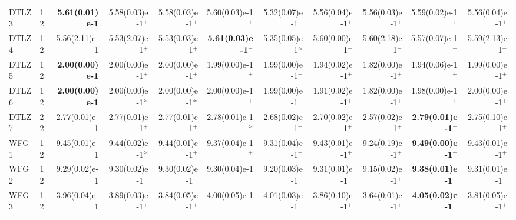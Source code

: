 \documentclass[pdflatex,sn-mathphys-ay]{sn-jnl}%
\theoremstyle{thmstyleone}%
\theoremstyle{thmstyletwo}%
\theoremstyle{thmstylethree}%
\begin{document}
\begin{landscape}
{\begin{longtable}{llrrrrrrrrr}
			DTLZ3                             & 12  & \textbf{5.61(0.01)e-1} & 5.58(0.03)e-1$^{+}$       & 5.58(0.03)e-1$^{+}$       & 5.60(0.03)e-1$^{+}$          & 5.32(0.07)e-1$^{+}$       & 5.56(0.04)e-1$^{+}$          & 5.56(0.03)e-1$^{+}$       & 5.59(0.02)e-1$^{+}$          & 5.56(0.04)e-1$^{+}$          \\
			DTLZ4                             & 12  & 5.56(2.11)e-1          & 5.53(2.07)e-1$^{+}$       & 5.53(0.03)e-1$^{+}$       & \textbf{5.61(0.03)e-1}$^{-}$ & 5.35(0.05)e-1$^{\approx}$ & 5.60(0.00)e-1$^{-}$          & 5.60(2.18)e-1$^{-}$       & 5.57(0.07)e-1$^{-}$          & 5.59(2.13)e-1$^{-}$          \\
			DTLZ5                             & 12  & \textbf{2.00(0.00)e-1} & 2.00(0.00)e-1$^{+}$       & 2.00(0.00)e-1$^{+}$       & 1.99(0.00)e-1$^{+}$          & 1.99(0.00)e-1$^{+}$       & 1.94(0.02)e-1$^{+}$          & 1.82(0.00)e-1$^{+}$       & 1.94(0.06)e-1$^{+}$          & 1.99(0.00)e-1$^{+}$          \\
			DTLZ6                             & 12  & \textbf{2.00(0.00)e-1} & 2.00(0.00)e-1$^{\approx}$ & 2.00(0.00)e-1$^{\approx}$ & 2.00(0.00)e-1$^{+}$          & 1.99(0.00)e-1$^{+}$       & 1.91(0.02)e-1$^{+}$          & 1.82(0.00)e-1$^{+}$       & 1.98(0.00)e-1$^{+}$          & 2.00(0.00)e-1$^{+}$          \\
			DTLZ7                             & 22  & 2.77(0.01)e-1          & 2.77(0.01)e-1$^{+}$       & 2.77(0.01)e-1$^{+}$       & 2.78(0.01)e-1$^{\approx}$    & 2.68(0.02)e-1$^{+}$       & 2.70(0.02)e-1$^{+}$          & 2.57(0.02)e-1$^{+}$       & \textbf{2.79(0.01)e-1}$^{-}$ & 2.75(0.10)e-1$^{+}$          \\
			\midrule
			WFG1                              & 12  & 9.45(0.01)e-1          & 9.44(0.02)e-1$^{\approx}$ & 9.44(0.01)e-1$^{+}$       & 9.37(0.04)e-1$^{+}$          & 9.31(0.04)e-1$^{+}$       & 9.43(0.01)e-1$^{+}$          & 9.24(0.19)e-1$^{+}$       & \textbf{9.49(0.00)e-1}$^{-}$ & 9.43(0.01)e-1$^{+}$          \\
			WFG2                              & 12  & 9.29(0.02)e-1          & 9.30(0.02)e-1$^{-}$       & 9.30(0.02)e-1$^{-}$       & 9.30(0.04)e-1$^{-}$          & 9.20(0.03)e-1$^{+}$       & 9.31(0.01)e-1$^{-}$          & 9.15(0.02)e-1$^{+}$       & \textbf{9.38(0.01)e-1}$^{-}$ & 9.31(0.01)e-1$^{-}$          \\
			WFG3                              & 12  & 3.96(0.04)e-1          & 3.89(0.03)e-1$^{+}$       & 3.84(0.05)e-1$^{+}$       & 4.00(0.05)e-1$^{-}$          & 4.01(0.03)e-1$^{-}$       & 3.86(0.10)e-1$^{+}$          & 3.64(0.01)e-1$^{+}$       & \textbf{4.05(0.02)e-1}$^{-}$ & 3.81(0.05)e-1$^{+}$          \\

\end{longtable}}
\end{landscape}
\end{document}
